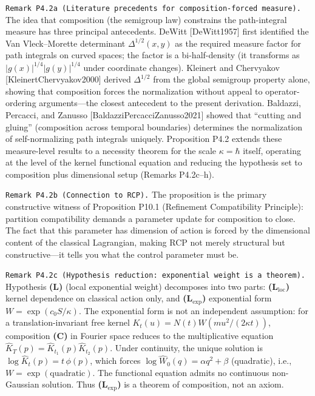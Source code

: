 \documentclass[
]{article}
\begin{document}
\texttt{Remark\ P4.2a\textquotesingle{}\ (Literature\ precedents\ for\ composition-forced\ measure).}
The idea that composition (the semigroup law) constrains the
path-integral measure has three principal antecedents. DeWitt
{[}DeWitt1957{]} first identified the Van Vleck--Morette determinant
\(\Delta^{1/2}(x,y)\) as the required measure factor for path integrals
on curved spaces; the factor is a bi-half-density (it transforms as
\(|g(x)|^{1/4}|g(y)|^{1/4}\) under coordinate changes). Kleinert and
Chervyakov {[}KleinertChervyakov2000{]} derived \(\Delta^{1/2}\) from
the global semigroup property alone, showing that composition forces the
normalization without appeal to operator-ordering arguments---the
closest antecedent to the present derivation. Baldazzi, Percacci, and
Zanusso {[}BaldazziPercacciZanusso2021{]} showed that ``cutting and
gluing'' (composition across temporal boundaries) determines the
normalization of self-normalizing path integrals uniquely. Proposition
P4.2 extends these measure-level results to a necessity theorem for the
scale \(\kappa=\hbar\) itself, operating at the level of the kernel
functional equation and reducing the hypothesis set to composition plus
dimensional setup (Remarks P4.2c--h).

\texttt{Remark\ P4.2b\ (Connection\ to\ RCP).} The proposition is the
primary constructive witness of Proposition P10.1 (Refinement
Compatibility Principle): partition compatibility demands a parameter
update for composition to close. The fact that this parameter has
dimension of action is forced by the dimensional content of the
classical Lagrangian, making RCP not merely structural but
constructive---it tells you what the control parameter must be.

\texttt{Remark\ P4.2c\ (Hypothesis\ reduction:\ exponential\ weight\ is\ a\ theorem).}
Hypothesis \textbf{(L)} (local exponential weight) decomposes into two
parts: \textbf{(L\(_{\mathrm{loc}}\))} kernel dependence on classical
action only, and \textbf{(L\(_{\mathrm{exp}}\))} exponential form
\(W=\exp(c_0 S/\kappa)\). The exponential form is not an independent
assumption: for a translation-invariant free kernel
\(K_t(u)=N(t)W(mu^2/(2\kappa t))\), composition \textbf{(C)} in Fourier
space reduces to the multiplicative equation
\(\hat K_T(p)=\hat K_{t_1}(p)\hat K_{t_2}(p)\). Under continuity, the
unique solution is \(\log\hat K_t(p)=t\,\phi(p)\), which forces
\(\log\hat W_0(q)=\alpha q^2+\beta\) (quadratic), i.e.,
\(W=\exp(\text{quadratic})\). The functional equation admits no
continuous non-Gaussian solution. Thus \textbf{(L\(_{\mathrm{exp}}\))}
is a theorem of composition, not an axiom.
\end{document}
